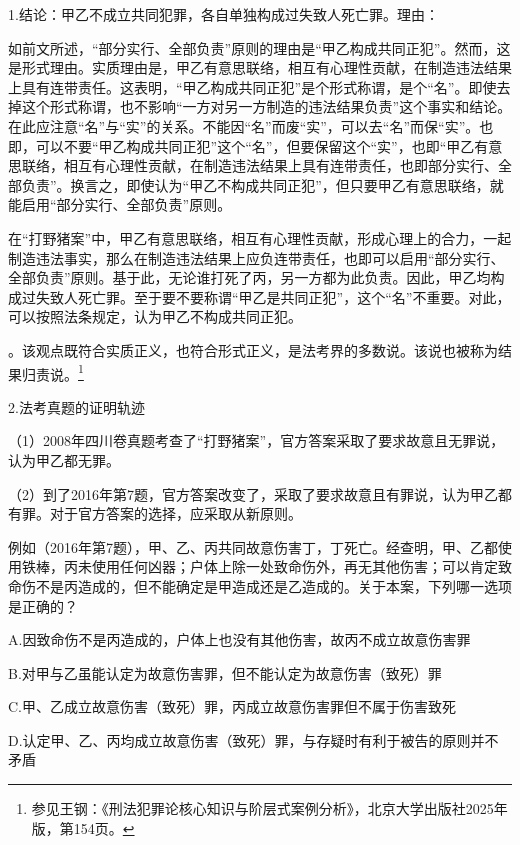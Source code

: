 1.结论：甲乙不成立共同犯罪，各自单独构成过失致人死亡罪。理由：

如前文所述，“部分实行、全部负责”原则的理由是“甲乙构成共同正犯”。然而，这是形式理由。实质理由是，甲乙有意思联络，相互有心理性贡献，在制造违法结果上具有连带责任。这表明，“甲乙构成共同正犯”是个形式称谓，是个“名”。即使去掉这个形式称谓，也不影响“一方对另一方制造的违法结果负责”这个事实和结论。在此应注意“名”与“实”的关系。不能因“名”而废“实”，可以去“名”而保“实”。也即，可以不要“甲乙构成共同正犯”这个“名”，但要保留这个“实”，也即“甲乙有意思联络，相互有心理性贡献，在制造违法结果上具有连带责任，也即部分实行、全部负责”。换言之，即使认为“甲乙不构成共同正犯”，但只要甲乙有意思联络，就能启用“部分实行、全部负责”原则。


在“打野猪案”中，甲乙有意思联络，相互有心理性贡献，形成心理上的合力，一起制造违法事实，那么在制造违法结果上应负连带责任，也即可以启用“部分实行、全部负责”原则。基于此，无论谁打死了丙，另一方都为此负责。因此，甲乙均构成过失致人死亡罪。至于要不要称谓“甲乙是共同正犯”，这个“名”不重要。对此，可以按照法条规定，认为甲乙不构成共同正犯。

。该观点既符合实质正义，也符合形式正义，是法考界的多数说。该说也被称为结果归责说。\footnote{参见王钢：《刑法犯罪论核心知识与阶层式案例分析》，北京大学出版社2025年版，第154页。}

2.法考真题的证明轨迹

（1）2008年四川卷真题考查了“打野猪案”，官方答案采取了要求故意且无罪说，认为甲乙都无罪。

（2）到了2016年第7题，官方答案改变了，采取了要求故意且有罪说，认为甲乙都有罪。对于官方答案的选择，应采取从新原则。

例如（2016年第7题），甲、乙、丙共同故意伤害丁，丁死亡。经查明，甲、乙都使用铁棒，丙未使用任何凶器；户体上除一处致命伤外，再无其他伤害；可以肯定致命伤不是丙造成的，但不能确定是甲造成还是乙造成的。关于本案，下列哪一选项是正确的？

A.因致命伤不是丙造成的，户体上也没有其他伤害，故丙不成立故意伤害罪

B.对甲与乙虽能认定为故意伤害罪，但不能认定为故意伤害（致死）罪

C.甲、乙成立故意伤害（致死）罪，丙成立故意伤害罪但不属于伤害致死

D.认定甲、乙、丙均成立故意伤害（致死）罪，与存疑时有利于被告的原则并不矛盾

